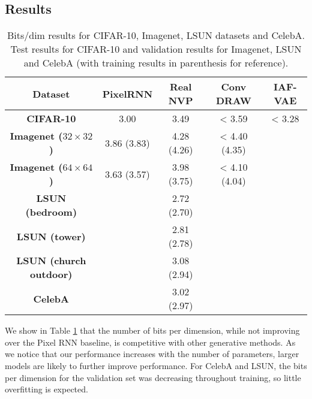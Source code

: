\documentclass{article}
\begin{document}
\subsection{Results}
\begin{table}
    \begin{center}
    \begin{tabular}{| c | c | c | c | c |}
      \hline
      \textbf{Dataset} & \textbf{PixelRNN} \citep{oord2016pixel} & \textbf{Real NVP} & \textbf{Conv DRAW \citep{gregor2016towards}} & \textbf{IAF-VAE \citep{kingma2016improving}} \\ \hline
      \textbf{CIFAR-10} & 3.00 & 3.49 & < 3.59 & < 3.28 \\ \hline
      \textbf{Imagenet ($32 \times 32$)} & 3.86 (3.83) & 4.28 (4.26) &  < 4.40 (4.35) & \cellcolor{black!25} \\ \hline
      \textbf{Imagenet ($64 \times 64$)} & 3.63 (3.57) & 3.98 (3.75) & < 4.10 (4.04) & \cellcolor{black!25} \\ \hline
      \textbf{LSUN (bedroom)} & \cellcolor{black!25} & 2.72 (2.70) & \cellcolor{black!25} & \cellcolor{black!25} \\ \hline
      \textbf{LSUN (tower)} & \cellcolor{black!25} & 2.81 (2.78) & \cellcolor{black!25} & \cellcolor{black!25} \\ \hline
      \textbf{LSUN (church outdoor)} & \cellcolor{black!25} & 3.08 (2.94) & \cellcolor{black!25} & \cellcolor{black!25} \\ \hline
      \textbf{CelebA} & \cellcolor{black!25} & 3.02 (2.97) & \cellcolor{black!25} & \cellcolor{black!25} \\ \hline
    \end{tabular}
    \caption{Bits/dim results for CIFAR-10, Imagenet, LSUN datasets and CelebA. Test results for CIFAR-10 and validation results for Imagenet, LSUN and CelebA (with training results in parenthesis for reference). \label{fig:quant}}
    \end{center}
\end{table}

We show in Table \ref{fig:quant} that the number of bits per dimension, while not improving over the Pixel RNN \citep{oord2016pixel} baseline, is competitive with other generative methods. As we notice that our performance increases with the number of parameters, larger models are likely to further improve performance.
For CelebA and LSUN, the bits per dimension for the validation set was decreasing throughout training, so little overfitting is expected.
\end{document}
